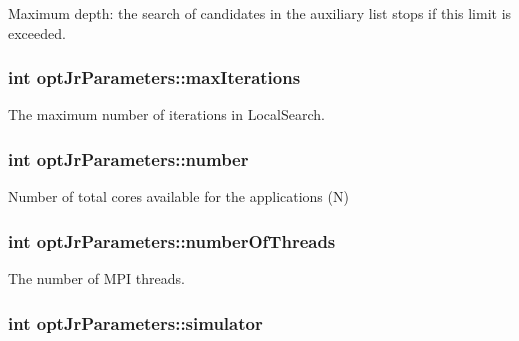 Maximum depth\-: the search of candidates in the auxiliary list stops if this limit is exceeded. 

\hypertarget{classoptJrParameters_af1f1ee05cb0a9962182b9330c7e9536b}{
\subsubsection[{max\-Iterations}]{\setlength{\rightskip}{0pt plus 5cm}int opt\-Jr\-Parameters\-::max\-Iterations\hspace{0.3cm}{\ttfamily [private]}}}\label{classoptJrParameters_af1f1ee05cb0a9962182b9330c7e9536b}


The maximum number of iterations in Local\-Search. 

\hypertarget{classoptJrParameters_a9d99c995ae7815448131832e13b7c723}{
\subsubsection[{number}]{\setlength{\rightskip}{0pt plus 5cm}int opt\-Jr\-Parameters\-::number\hspace{0.3cm}{\ttfamily [private]}}}\label{classoptJrParameters_a9d99c995ae7815448131832e13b7c723}


Number of total cores available for the applications (N) 

\hypertarget{classoptJrParameters_a7748d7ba51ef897423d145f2e33273d8}{
\subsubsection[{number\-Of\-Threads}]{\setlength{\rightskip}{0pt plus 5cm}int opt\-Jr\-Parameters\-::number\-Of\-Threads\hspace{0.3cm}{\ttfamily [private]}}}\label{classoptJrParameters_a7748d7ba51ef897423d145f2e33273d8}


The number of M\-P\-I threads. 

\hypertarget{classoptJrParameters_a8bb0a0aa1f458ff3973fbe43552e1cd5}{
\subsubsection[{simulator}]{\setlength{\rightskip}{0pt plus 5cm}int opt\-Jr\-Parameters\-::simulator\hspace{0.3cm}{\ttfamily [private]}}}\label{classoptJrParameters_a8bb0a0aa1f458ff3973fbe43552e1cd5}



